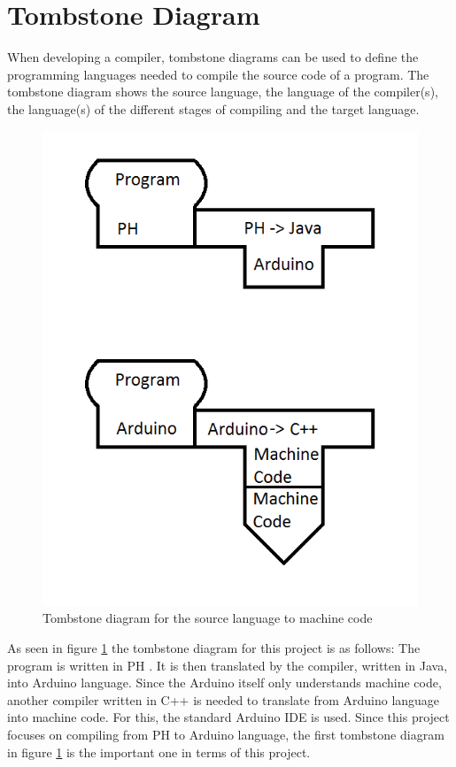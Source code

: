 \section{Tombstone Diagram}
When developing a compiler, tombstone diagrams can be used to define the programming languages needed to compile the source code of a program. The tombstone diagram shows the source language, the language of the compiler(s), the language(s) of the different stages of compiling and the target language.

\begin{figure}[H]
	\centering
		\includegraphics{billeder/tombstone_diagram.png}
		\caption{Tombstone diagram for the source language to machine code}
		\label{fig:tombstone}
\end{figure}

As seen in figure \ref{fig:tombstone} the tombstone diagram for this project is as follows: The program is written in PH . It is then translated by the compiler, written in Java, into Arduino language. Since the Arduino itself only understands machine code, another compiler written in C++ is needed to translate from Arduino language into machine code. For this, the standard Arduino IDE is used.
Since this project focuses on compiling from PH to Arduino language, the first tombstone diagram in figure \ref{fig:tombstone} is the important one in terms of this project.